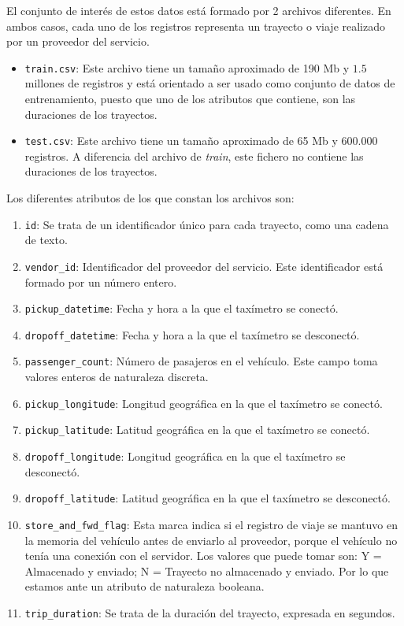 \documentclass[12pt]{article}
\begin{document}
El conjunto de interés de estos datos está formado por 2 archivos diferentes. En ambos casos, cada uno de los registros representa un trayecto o viaje realizado por un proveedor del servicio.
\begin{itemize}
    \item \texttt{train.csv}: Este archivo tiene un tamaño aproximado de 190 Mb y $1.5$ millones de registros y está orientado a ser usado como conjunto de datos de entrenamiento, puesto que uno de los atributos que contiene, son las duraciones de los trayectos.
    \item \texttt{test.csv}: Este archivo tiene un tamaño aproximado de 65 Mb y 600.000 registros. A diferencia del archivo de \textit{train}, este  fichero no contiene las duraciones de los trayectos.
\end{itemize}
Los diferentes atributos de los que constan los archivos son:
\begin{enumerate}
    \item \texttt{id}: Se trata de un identificador único para cada trayecto, como una cadena de texto.
    \item \texttt{vendor\_id}: Identificador del proveedor del servicio. Este identificador está formado por un número entero.
    \item \texttt{pickup\_datetime}: Fecha y hora a la que el taxímetro se conectó.
    \item \texttt{dropoff\_datetime}: Fecha y hora a la que el taxímetro se desconectó.
    \item \texttt{passenger\_count}: Número de pasajeros en el vehículo. Este campo toma valores enteros de naturaleza discreta.
    \item \texttt{pickup\_longitude}: Longitud geográfica en la que el taxímetro se conectó.
    \item \texttt{pickup\_latitude}: Latitud geográfica en la que el taxímetro se conectó.
    \item \texttt{dropoff\_longitude}: Longitud geográfica en la que el taxímetro se desconectó.
    \item \texttt{dropoff\_latitude}: Latitud geográfica en la que el taxímetro se desconectó.
    \item \texttt{store\_and\_fwd\_flag}: Esta marca indica si el registro de viaje se mantuvo en la memoria del vehículo antes de enviarlo al proveedor, porque el vehículo no tenía una conexión con el servidor. Los valores que puede tomar son: Y = Almacenado y enviado; N = Trayecto no almacenado y enviado. Por lo que estamos ante un atributo de naturaleza booleana.
    \item \texttt{trip\_duration}: Se trata de la duración del trayecto, expresada en segundos.
\end{enumerate}
\end{document}
